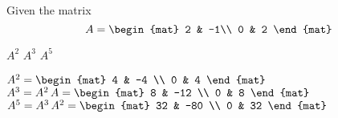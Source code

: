 
\begin{Exercise}[
name={},
title={}, 
difficulty=0,
origin={\cite{CR}}]
Given the matrix
\[
	A = \begin{mat} 2 & -1\\ 0 & 2 \end{mat}
\]
\begin{multicols}{3}
	\Question $A^2$
	\Question $A^3$
	\Question $A^5$ 
	\EndCurrentQuestion
\end{multicols}
\end{Exercise}

\begin{Answer}
\begin{multicols}{2}
	\Question $A^2 =  \begin{mat} 4 & -4 \\ 0 & 4 \end{mat}$
	\Question $A^3 = A^2 \, A   =  \begin{mat} 8 & -12 \\ 0 & 8 \end{mat}$
	\Question $A^5 = A^3 \, A^2 =  \begin{mat} 32 & -80 \\ 0 & 32 \end{mat}$
        \EndCurrentQuestion
\end{multicols}
\end{Answer}
